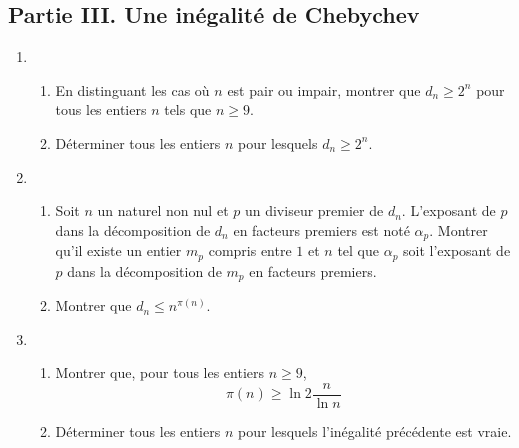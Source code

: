 \subsection*{Partie III. Une inégalité de Chebychev}
\begin{enumerate}
 \item 
\begin{enumerate}
 \item En distinguant les cas où $n$ est pair ou impair, montrer que $d_n\geq 2^n$ pour tous les entiers $n$ tels que $n\geq 9$.
 \item Déterminer tous les entiers $n$ pour lesquels $d_n\geq 2^n$.
\end{enumerate}
\item
\begin{enumerate}
\item Soit $n$ un naturel non nul et $p$ un diviseur premier de $d_n$. L'exposant de $p$ dans la décomposition de $d_n$ en facteurs premiers est noté $\alpha_p$. Montrer qu'il existe un entier $m_p$ compris entre $1$ et $n$ tel que $\alpha_p$ soit l'exposant de $p$ dans la décomposition de $m_p$ en facteurs premiers.
\item Montrer que $d_n\leq n^{\pi(n)}$.
\end{enumerate}
\item
\begin{enumerate}
 \item Montrer que, pour tous les entiers $n\geq 9$,
\begin{displaymath}
 \pi(n)\geq \ln 2 \frac{n}{\ln n}
\end{displaymath}
\item Déterminer tous les entiers $n$ pour lesquels l'inégalité précédente est vraie.
\end{enumerate}

\end{enumerate}
